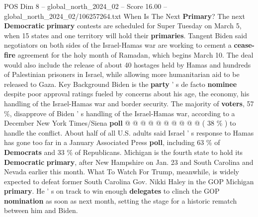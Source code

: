 \begin{textsample}{POS Dim 8 – global\_north\_2024\_02 – Score 16.00 – global\_north\_2024\_02/106257264.txt}
When Is The Next \textbf{Primary}?
The next \textbf{Democratic} \textbf{primary} contests are scheduled for Super Tuesday on March 5, when 15 states and one territory will hold their \textbf{primaries}.
Tangent Biden said negotiators on both sides of the Israel-Hamas war are working to cement a \textbf{cease-fire} agreement for the holy month of Ramadan, which begins March 10.
The deal would also include the release of about 40 hostages held by Hamas and hundreds of Palestinian prisoners in Israel, while allowing more humanitarian aid to be released to Gaza.
Key Background Biden is the \textbf{party} ' s de facto \textbf{nominee} despite poor approval ratings fueled by concerns about his age, the economy, his handling of the Israel-Hamas war and border security.
The majority of \textbf{voters}, 57 \%, disapprove of Biden ' s handling of the Israel-Hamas war, according to a December New York Times/Siena \textbf{poll} @ @ @ @ @ @ @ @ @ @ ( 38 \% ) to handle the conflict.
About half of all U.S. adults said Israel ' s response to Hamas has gone too far in a January Associated Press \textbf{poll}, including 63 \% of \textbf{Democrats} and 33 \% of Republicans.
Michigan is the fourth state to hold its \textbf{Democratic} \textbf{primary}, after New Hampshire on Jan. 23 and South Carolina and Nevada earlier this month.
What To Watch For Trump, meanwhile, is widely expected to defeat former South Carolina Gov.
Nikki Haley in the GOP Michigan \textbf{primary}.
He ' s on track to win enough \textbf{delegates} to clinch the GOP \textbf{nomination} as soon as next month, setting the stage for a historic rematch between him and Biden.

\end{textsample}
